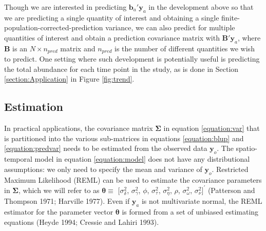 \documentclass[]{article}    %
\begin{document}
Though we are interested in predicting \(\mathbf{b}_a ' \mathbf{y}_a\)
in the development above so that we are predicting a single quantity of
interest and obtaining a single finite-population-corrected-prediction
variance, we can also predict for multiple quantities of interest and
obtain a prediction covariance matrix with \(\mathbf{B}' \mathbf{y}_a\),
where \(\mathbf{B}\) is an \(N \times n_{pred}\) matrix and \(n_{pred}\)
is the number of different quantities we wish to predict. One setting
where such development is potentially useful is predicting the total
abundance for each time point in the study, as is done in Section
\ref{section:Application} in Figure \ref{fig:trend}.

\hypertarget{estimation}{%
\subsection{Estimation}\label{estimation}}

In practical applications, the covariance matrix \(\bm{\Sigma}\) in
equation \ref{equation:var} that is partitioned into the various
sub-matrices in equations \ref{equation:blup} and \ref{equation:predvar}
needs to be estimated from the observed data \(\mathbf{y}_o\). The
spatio-temporal model in equation \ref{equation:model} does not have any
distributional assumptions: we only need to specify the mean and
variance of \(\mathbf{y}_o\). Restricted Maximum Likelihood (REML) can
be used to estimate the covariance parameters in \(\bm{\Sigma}\), which
we will refer to as \(\bm{\theta} \equiv\) \([\sigma^2_{\delta}\),
\(\sigma^2_{\gamma}\), \(\phi\), \(\sigma^2_{\tau}\),
\(\sigma^2_{\eta}\), \(\rho\), \(\sigma^2_{\omega}\),
\(\sigma^2_{\nu}]^\prime\) (Patterson and Thompson 1971; Harville 1977).
Even if \(\mathbf{y}_a\) is not multivariate normal, the REML estimator
for the parameter vector \(\bm{\theta}\) is formed from a set of
unbiased estimating equations (Heyde 1994; Cressie and Lahiri 1993).
\end{document}

